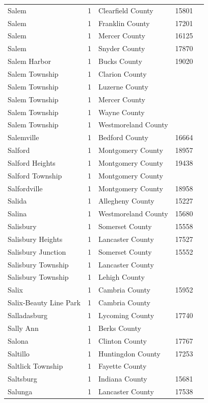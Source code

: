 \documentclass{article}
\begin{document}
\begin{tabular}{lllll}
Salem & 1 & Clearfield County & 15801 &  \\
Salem & 1 & Franklin County & 17201 &  \\
Salem & 1 & Mercer County & 16125 &  \\
Salem & 1 & Snyder County & 17870 &  \\
Salem Harbor & 1 & Bucks County & 19020 &  \\
Salem Township & 1 & Clarion County &  &  \\
Salem Township & 1 & Luzerne County &  &  \\
Salem Township & 1 & Mercer County &  &  \\
Salem Township & 1 & Wayne County &  &  \\
Salem Township & 1 & Westmoreland County &  &  \\
Salemville & 1 & Bedford County & 16664 &  \\
Salford & 1 & Montgomery County & 18957 &  \\
Salford Heights & 1 & Montgomery County & 19438 &  \\
Salford Township & 1 & Montgomery County &  &  \\
Salfordville & 1 & Montgomery County & 18958 &  \\
Salida & 1 & Allegheny County & 15227 &  \\
Salina & 1 & Westmoreland County & 15680 &  \\
Salisbury & 1 & Somerset County & 15558 &  \\
Salisbury Heights & 1 & Lancaster County & 17527 &  \\
Salisbury Junction & 1 & Somerset County & 15552 &  \\
Salisbury Township & 1 & Lancaster County &  &  \\
Salisbury Township & 1 & Lehigh County &  &  \\
Salix & 1 & Cambria County & 15952 &  \\
Salix-Beauty Line Park & 1 & Cambria County &  &  \\
Salladasburg & 1 & Lycoming County & 17740 &  \\
Sally Ann & 1 & Berks County &  &  \\
Salona & 1 & Clinton County & 17767 &  \\
Saltillo & 1 & Huntingdon County & 17253 &  \\
Saltlick Township & 1 & Fayette County &  &  \\
Saltsburg & 1 & Indiana County & 15681 &  \\
Salunga & 1 & Lancaster County & 17538 &  \\

\end{tabular}
\end{document}

